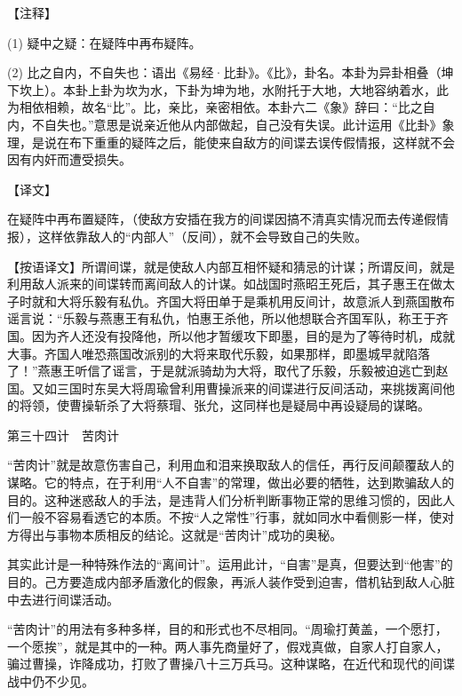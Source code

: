 \documentclass[12pt,UTF8]{ctexbook}
\begin{document}
【注释】


(1) 疑中之疑：在疑阵中再布疑阵。

(2) 比之自内，不自失也：语出《易经·比卦》。《比》，卦名。本卦为异卦相叠（坤下坎上）。本卦上卦为坎为水，下卦为坤为地，水附托于大地，大地容纳着水，此为相依相赖，故名“比”。比，亲比，亲密相依。本卦六二《象》辞曰：“比之自内，不自失也。”意思是说亲近他从内部做起，自己没有失误。此计运用《比卦》象理，是说在布下重重的疑阵之后，能使来自敌方的间谍去误传假情报，这样就不会因有内奸而遭受损失。





【译文】


在疑阵中再布置疑阵，（使敌方安插在我方的间谍因搞不清真实情况而去传递假情报），这样依靠敌人的“内部人”（反间），就不会导致自己的失败。

【按语译文】所谓间谍，就是使敌人内部互相怀疑和猜忌的计谋；所谓反间，就是利用敌人派来的间谍转而离间敌人的计谋。如战国时燕昭王死后，其子惠王在做太子时就和大将乐毅有私仇。齐国大将田单于是乘机用反间计，故意派人到燕国散布谣言说：“乐毅与燕惠王有私仇，怕惠王杀他，所以他想联合齐国军队，称王于齐国。因为齐人还没有投降他，所以他才暂缓攻下即墨，目的是为了等待时机，成就大事。齐国人唯恐燕国改派别的大将来取代乐毅，如果那样，即墨城早就陷落了！”燕惠王听信了谣言，于是就派骑劫为大将，取代了乐毅，乐毅被迫逃亡到赵国。又如三国时东吴大将周瑜曾利用曹操派来的间谍进行反间活动，来挑拨离间他的将领，使曹操斩杀了大将蔡瑁、张允，这同样也是疑局中再设疑局的谋略。





第三十四计　苦肉计


“苦肉计”就是故意伤害自己，利用血和泪来换取敌人的信任，再行反间颠覆敌人的谋略。它的特点，在于利用“人不自害”的常理，做出必要的牺牲，达到欺骗敌人的目的。这种迷惑敌人的手法，是违背人们分析判断事物正常的思维习惯的，因此人们一般不容易看透它的本质。不按“人之常性”行事，就如同水中看侧影一样，使对方得出与事物本质相反的结论。这就是“苦肉计”成功的奥秘。

其实此计是一种特殊作法的“离间计”。运用此计，“自害”是真，但要达到“他害”的目的。己方要造成内部矛盾激化的假象，再派人装作受到迫害，借机钻到敌人心脏中去进行间谍活动。

“苦肉计”的用法有多种多样，目的和形式也不尽相同。“周瑜打黄盖，一个愿打，一个愿挨”，就是其中的一种。两人事先商量好了，假戏真做，自家人打自家人，骗过曹操，诈降成功，打败了曹操八十三万兵马。这种谋略，在近代和现代的间谍战中仍不少见。
\end{document}
